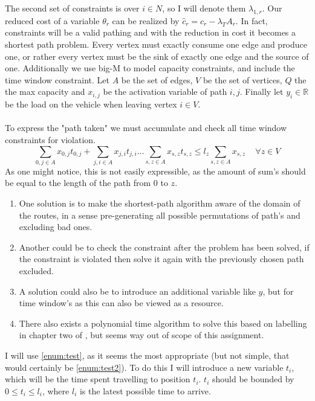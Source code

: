 \documentclass{article}
\begin{document}
    The second set of constraints is over $i \in N$, so I will denote them $\lambda_{1, r}$.
    Our reduced cost of a variable $\theta_r$ can be realized by $\hat{c}_r = c_r - \lambda_T A_r$.
    In fact, constraints will be a valid pathing and with the reduction in cost it becomes a shortest path problem.
    Every vertex must exactly consume one edge and produce one, or rather every vertex must be the sink of exactly one edge and the source of one.
    Additionally we use big-M to model capacity constraints, and include the time window constraint.
    Let $A$ be the set of edges, $V$ be the set of vertices, $Q$ the the max capacity and $x_{i,j}$ be the activation variable of path $i,j$.
    Finally let $y_i \in \mathbb{R}$ be the load on the vehicle when leaving vertex $i \in V$.\\\\
    To express the "path taken" we must accumulate and check all time window constraints for violation.
    \[
        \sum_{0, j \in A} x_{0, j} t_{0, j} + \sum_{j, i \in A} x_{j, i} t_{j, i} \dots \sum_{s, z \in A} x_{s, z} t_{s, z} \leq l_z \sum_{s, z \in A} x_{s, z} \,\,\,\,\,\,\, \forall z \in V
    \]
    As one might notice, this is not easily expressible, as the amount of sum's should be equal to the length of the path from $0$ to $z$.
    \begin{enumerate}
        \item One solution is to make the shortest-path algorithm aware of the domain of the routes, in a sense pre-generating all possible permutations of path's and excluding bad ones.
        \item\label{enum:test2} Another could be to check the constraint after the problem has been solved, if the constraint is violated then solve it again with the previously chosen path excluded.
        \item\label{enum:test} A solution could also be to introduce an additional variable like $y$, but for time window's as this can also be viewed as a resource.
        \item There also exists a polynomial time algorithm to solve this based on labelling in chapter two of \cite{petersen2011shortest}, but seems way out of scope of this assignment.
    \end{enumerate}
    I will use \autoref{enum:test}, as it seems the most appropriate (but not simple, that would certainly be \autoref{enum:test2}).
    To do this I will introduce a new variable $t_i$, which will be the time spent travelling to position $t_i$.
    $t_i$ should be bounded by $0 \leq t_i \leq l_i$, where $l_i$ is the latest possible time to arrive.
\end{document}

